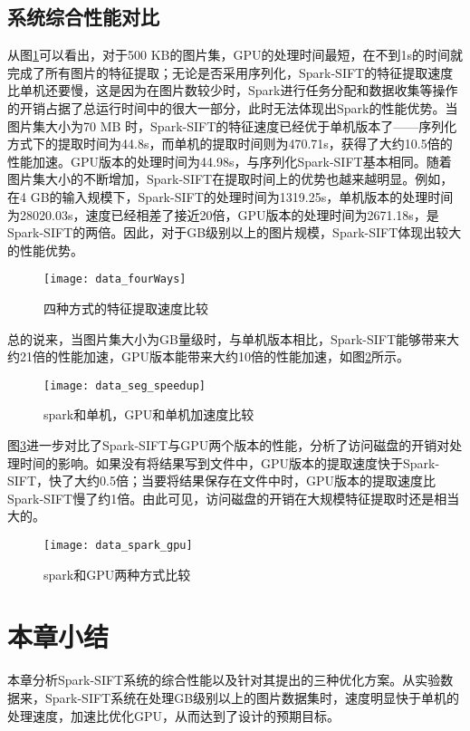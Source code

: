 \subsection{系统综合性能对比}
从图\ref{fig:data_fourWays}可以看出，对于500 KB的图片集，GPU的处理时间最短，在不到1s的时间就完成了所有图片的特征提取；无论是否采用序列化，Spark-SIFT的特征提取速度比单机还要慢，这是因为在图片数较少时，Spark进行任务分配和数据收集等操作的开销占据了总运行时间中的很大一部分，此时无法体现出Spark的性能优势。当图片集大小为70 MB 时，Spark-SIFT的特征速度已经优于单机版本了——序列化方式下的提取时间为44.8s，而单机的提取时间则为470.71s，获得了大约10.5倍的性能加速。GPU版本的处理时间为44.98s，与序列化Spark-SIFT基本相同。随着图片集大小的不断增加，Spark-SIFT在提取时间上的优势也越来越明显。例如，在4 GB的输入规模下，Spark-SIFT的处理时间为1319.25s，单机版本的处理时间为28020.03s，速度已经相差了接近20倍，GPU版本的处理时间为2671.18s，是Spark-SIFT的两倍。因此，对于GB级别以上的图片规模，Spark-SIFT体现出较大的性能优势。
\begin{figure}[htp]
\centering
\texttt{[image: data\_fourWays]}
\caption{四种方式的特征提取速度比较}
\label{fig:data_fourWays}
\end{figure}

总的说来，当图片集大小为GB量级时，与单机版本相比，Spark-SIFT能够带来大约21倍的性能加速，GPU版本能带来大约10倍的性能加速，如图\ref{fig:data_seg_speedup}所示。
\begin{figure}[htp]
\centering
\texttt{[image: data\_seg\_speedup]}
\caption{spark和单机，GPU和单机加速度比较}
\label{fig:data_seg_speedup}
\end{figure}

图\ref{fig:data_spark_gpu}进一步对比了Spark-SIFT与GPU两个版本的性能，分析了访问磁盘的开销对处理时间的影响。如果没有将结果写到文件中，GPU版本的提取速度快于Spark-SIFT，快了大约0.5倍；当要将结果保存在文件中时，GPU版本的提取速度比Spark-SIFT慢了约1倍。由此可见，访问磁盘的开销在大规模特征提取时还是相当大的。
\begin{figure}[htp]
\centering
\texttt{[image: data\_spark\_gpu]}
\caption{spark和GPU两种方式比较}
\label{fig:data_spark_gpu}
\end{figure}
\section{本章小结}
本章分析Spark-SIFT系统的综合性能以及针对其提出的三种优化方案。从实验数据来，Spark-SIFT系统在处理GB级别以上的图片数据集时，速度明显快于单机的处理速度，加速比优化GPU，从而达到了设计的预期目标。
